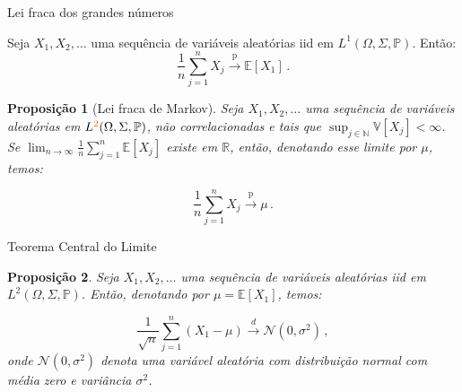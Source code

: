 \documentclass[11pt]{beamer}
\newtheorem{proposition}{Proposição}
\begin{document}
		\begin{frame}{Lei fraca dos grandes números}
			\begin{corollary}
			Seja $X_1, X_2,\ldots$ uma sequência de variáveis aleatórias iid em $L^1(\Omega,\Sigma,\mathbb{P})$.
			Então:
			$$\frac{1}{n}\sum_{j=1}^n X_j \overset{\text{p}}{\to} \mathbb{E}[X_1]\, .$$
		\end{corollary}
		
					\begin{proposition}[Lei fraca de Markov]
			Seja $X_1, X_2,\ldots$ uma sequência de variáveis aleatórias em $L^{\color{red}2}(\Omega,\Sigma,\mathbb{P})$, não correlacionadas e tais que $\sup_{j \in \mathbb{N}}\mathbb{V}[X_j] <\infty$. Se $\lim_{n\to\infty} \frac{1}{n}\sum_{j=1}^n \mathbb{E}[X_j]$ existe em $\mathbb{R}$, então, denotando esse limite por $\mu$, temos:
			 
		$$\frac{1}{n}\sum_{j=1}^n X_j \overset{\text{p}}{\to} \mu\, .$$
		\end{proposition}
	\end{frame}
		\begin{frame}{Teorema Central do Limite}
			\begin{proposition}
						Seja $X_1, X_2,\ldots$ uma sequência de variáveis aleatórias iid em $L^2(\Omega,\Sigma,\mathbb{P})$. Então, denotando por $\mu = \mathbb{E}[X_1]$, temos:
						
						
						$$\frac{1}{\sqrt{n}}\sum_{j=1}^n (X_1 - \mu) \overset{d}{\to} \mathcal{N}(0,\sigma^2)\, , $$
						onde $\mathcal{N}(0,\sigma^2)$ denota uma variável aleatória com distribuição normal com média zero e variância $\sigma^2$.
			\end{proposition}

	\end{frame}
\end{document}

